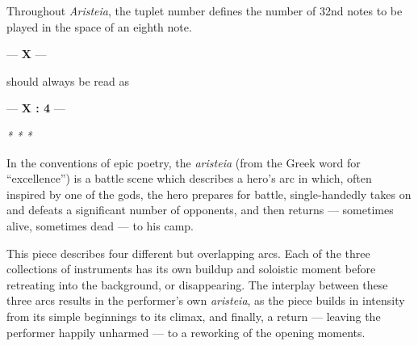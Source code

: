 \documentclass{article}
\begin{document}
Throughout \textit{Aristeia}, the tuplet number defines the number of 32nd notes to be played in the space of an eighth note.

\hspace{2em} --- \textbf{X} ---

should always be read as

\hspace{1.35em} --- \textbf{X : 4} ---


\vfill

\begin{center}

  \textit{* \hspace{1em} * \hspace{1em} *}
  \vspace*{1\baselineskip}
\end{center}

  In the conventions of epic poetry, the \emph{aristeia} (from the Greek word for ``excellence'') is a battle scene which describes a hero’s arc in which, often inspired by one of the gods, the hero prepares for battle, single-handedly takes on and defeats a significant number of opponents, and then returns — sometimes alive, sometimes dead — to his camp.

This piece describes four different but overlapping arcs. Each of the three collections of instruments has its own buildup and soloistic moment before retreating into the background, or disappearing. The interplay between these three arcs results in the performer’s own \emph{aristeia}, as the piece builds in intensity from its simple beginnings to its climax, and finally, a return — leaving the performer happily unharmed — to a reworking of the opening moments.
\end{document}
